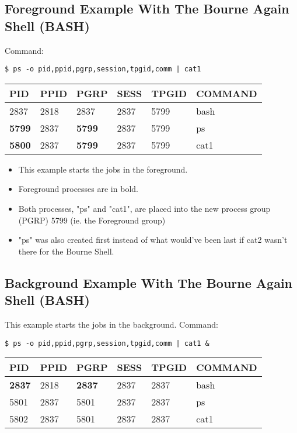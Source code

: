 \documentclass{article}
\renewcommand{\b}[1]{\textbf{#1}}
\begin{document}
\subsection{Foreground Example With The Bourne Again Shell (BASH)}
Command:
\begin{verbatim}
$ ps -o pid,ppid,pgrp,session,tpgid,comm | cat1
\end{verbatim}
\begin{table}[h!]
    \begin{center}
        \begin{tabular}{l l l l l l}
            PID      & PPID & PGRP     & SESS & TPGID & COMMAND \\
            \hline
            2837     & 2818 & 2837     & 2837 & 5799  & bash    \\
            \b{5799} & 2837 & \b{5799} & 2837 & 5799  & ps      \\
            \b{5800} & 2837 & \b{5799} & 2837 & 5799  & cat1    \\
        \end{tabular}
    \end{center}
\end{table}
\begin{itemize}
    \item This example starts the jobs in the foreground.
    \item Foreground processes are in bold.
    \item Both processes, "ps" and "cat1", are placed into the new process group
        (PGRP) 5799 (ie. the Foreground group)
    \item "ps" was also created first instead of what would've been last if 
        cat2 wasn't there for the Bourne Shell.
\end{itemize}

\subsection{Background Example With The Bourne Again Shell (BASH)}
\large{This example starts the jobs in the background.}\newline
Command:
\begin{verbatim}
$ ps -o pid,ppid,pgrp,session,tpgid,comm | cat1 &
\end{verbatim}
\begin{table}[h!]
    \begin{center}
        \begin{tabular}{l l l l l l}
            PID      & PPID & PGRP     & SESS & TPGID & COMMAND \\
            \hline
            \b{2837} & 2818 & \b{2837} & 2837 & 2837  & bash    \\
            5801     & 2837 & 5801     & 2837 & 2837  & ps      \\
            5802     & 2837 & 5801     & 2837 & 2837  & cat1    \\
        \end{tabular}
    \end{center}
\end{table}
\end{document}
